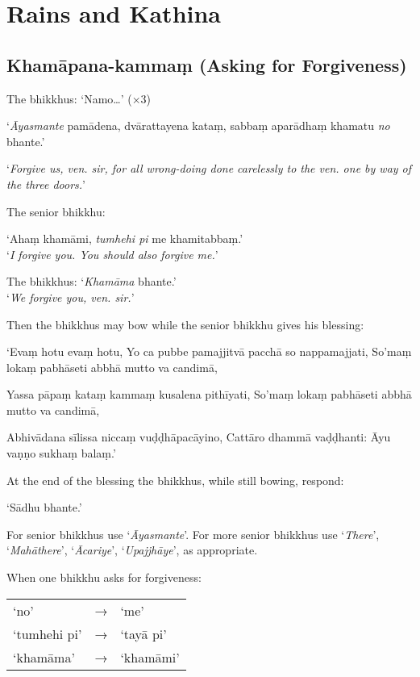 \chapter{Rains and Kathina}

\section{Khamāpana-kammaṃ (Asking for Forgiveness)}

The bhikkhus: ‘Namo…’ (×3)

‘\emph{Āyasmante} pamādena, dvārattayena kataṃ, sabbaṃ aparādhaṃ khamatu
\emph{no} bhante.’

‘\emph{Forgive us, ven. sir, for all wrong-doing done carelessly to the ven. one
  by way of the three doors.}’

The senior bhikkhu:

‘Ahaṃ khamāmi, \emph{tumhehi pi} me khamitabbaṃ.’\\
‘\emph{I forgive you. You should also forgive me.}’

The bhikkhus: ‘\emph{Khamāma} bhante.’\\
‘\emph{We forgive you, ven. sir.}’

Then the bhikkhus may bow while the senior bhikkhu gives his blessing:

‘Evaṃ hotu evaṃ hotu, Yo ca pubbe pamajjitvā pacchā so nappamajjati, So'maṃ
lokaṃ pabhāseti abbhā mutto va candimā,\\
\mbox{}

Yassa pāpaṃ kataṃ kammaṃ kusalena pithīyati, So'maṃ lokaṃ pabhāseti abbhā mutto
va candimā, 

Abhivādana sīlissa niccaṃ vuḍḍhāpacāyino, Cattāro dhammā vaḍḍhanti: Āyu vaṇṇo
sukhaṃ balaṃ.’ 

At the end of the blessing the bhikkhus, while still bowing, respond:

‘Sādhu bhante.’

For senior bhikkhus use ‘\emph{Āyasmante}’. For more senior bhikkhus use
‘\emph{There}’, ‘\emph{Mahāthere}’, ‘\emph{Ācariye}’, ‘\emph{Upajjhāye}’, as
appropriate.

When one bhikkhu asks for forgiveness:

\begin{tabular}{@{}lll@{}}
‘no’ & → & ‘me’\\
‘tumhehi pi’ & → & ‘tayā pi’\\
‘khamāma’ & → & ‘khamāmi’\\
\end{tabular}

